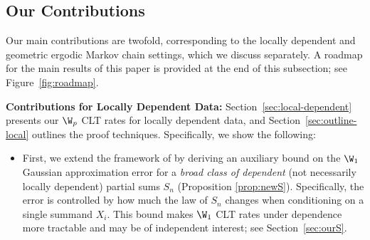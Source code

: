 \documentclass[mnsc,nonblindrev]{informs3}
\begin{document}
\subsection{Our Contributions}
Our main contributions are twofold, corresponding to the locally dependent and geometric ergodic Markov chain
settings, which we discuss separately. A roadmap for the main results of this paper is provided at the end of this subsection; see Figure~\ref{fig:roadmap}.

\noindent\textbf{Contributions for Locally Dependent Data:} 
Section~\ref{sec:local-dependent} presents our $\W_p$ CLT rates for locally dependent
data, and Section~\ref{sec:outline-local} outlines the proof techniques.
Specifically, we show the following:
\begin{itemize}
  \item First, we extend the framework of \cite{raivc2018multivariate} by deriving an auxiliary bound on the $\W_1$ Gaussian approximation error for a \emph{broad class of dependent} (not necessarily locally dependent) partial sums $S_n$ (Proposition \ref{prop:newS}). Specifically, the error is
controlled by how much the law of $S_n$ changes when conditioning on a single summand $X_i$.
This bound makes $\W_1$ CLT rates under dependence more tractable and may be of
independent interest; see Section~\ref{sec:ourS}. 



\end{itemize}
\end{document}
